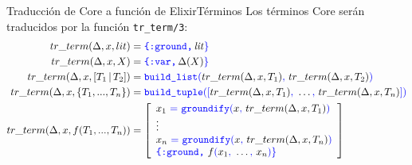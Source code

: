 \documentclass[14pt,aspectratio=169]{beamer}
\begin{document}
\begin{frame}{Traducción de Core a función de Elixir}{Términos}
  Los términos Core serán traducidos por la función \texttt{tr\_term/3}:
  \scriptsize \begin{align*}
    tr\_term(\Delta, x, lit) & = \textcolor{blue}{\texttt{\{:ground,}}\, \mathit{lit}\textcolor{blue}{\}} \\
    tr\_term(\Delta, x, X) & = \textcolor{blue}{\texttt{\{:var,}}\, \Delta(X)\textcolor{blue}{\}} \\
    tr\_term(\Delta, x, [T_1\, |\, T_2]) & = \textcolor{blue}{\texttt{build\_list}(}tr\_term(\Delta, x, T_1)\textcolor{blue}{,}\ tr\_term(\Delta, x, T_2)\textcolor{blue}{)} \\
    tr\_term(\Delta, x, \{T_1, ..., T_n\}) & = \textcolor{blue}{\texttt{build\_tuple}([}tr\_term(\Delta, x, T_1)\textcolor{blue}{,}\ \ldots\textcolor{blue}{,}\ tr\_term(\Delta, x, T_n)\textcolor{blue}{])} \\
    tr\_term(\Delta, x, f(T_1, ..., T_n)) & = \left[
      \begin{array}{lcr}
        x_1\ \textcolor{blue}{=}\ \textcolor{blue}{\texttt{groundify}(}x\textcolor{blue}{,}\ tr\_term(\Delta, x, T_1)\textcolor{blue}{)} \\
        \vdots \\
        x_n\ \textcolor{blue}{=}\ \textcolor{blue}{\texttt{groundify}(}x\textcolor{blue}{,}\ tr\_term(\Delta, x, T_n)\textcolor{blue}{)} \\
        \textcolor{blue}{\texttt{\{:ground,}}\ f\textcolor{blue}{(}x_1\textcolor{blue}{,}\ \ldots\textcolor{blue}{,}\ x_n\textcolor{blue}{)}\textcolor{blue}{\}} \\
      \end{array}
        \right]
  \end{align*}
\end{frame}
\end{document}
